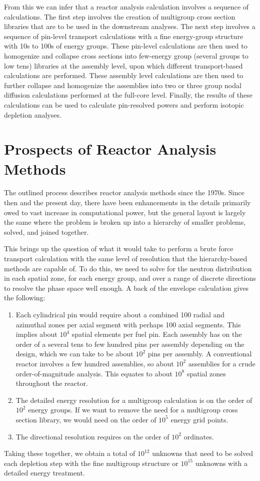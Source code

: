 From this we can infer that a reactor analysis calculation involves a sequence of calculations. The first step involves the creation of multigroup cross section libraries that are to be used in the downstream analyses. The next step involves a sequence of pin-level transport calculations with a fine energy-group structure with 10s to 100s of energy groups. These pin-level calculations are then used to homogenize and collapse cross sections into few-energy group (several groups to low tens) libraries at the assembly level, upon which different transport-based calculations are performed. These assembly level calculations are then used to further collapse and homogenize the assemblies into two or three group nodal diffusion calculations performed at the full-core level. Finally, the results of these calculations can be used to calculate pin-resolved powers and perform isotopic depletion analyses.

\section*{Prospects of Reactor Analysis Methods}

The outlined process describes reactor analysis methods since the 1970s. Since then and the present day, there have been enhancements in the details primarily owed to vast increase in computational power, but the general layout is largely the same where the problem is broken up into a hierarchy of smaller problems, solved, and joined together. 

This brings up the question of what it would take to perform a brute force transport calculation with the same level of resolution that the hierarchy-based methods are capable of. To do this, we need to solve for the neutron distribution in each spatial zone, for each energy group, and over a range of discrete directions to resolve the phase space well enough. A back of the envelope calculation gives the following:
\begin{enumerate}
  \item Each cylindrical pin would require about a combined 100 radial and azimuthal zones per axial segment with perhaps 100 axial segments. This implies about $10^4$ spatial elements per fuel pin. Each assembly has on the order of a several tens to few hundred pins per assembly depending on the design, which we can take to be about $10^2$ pins per assembly. A conventional reactor involves a few hundred assemblies, so about $10^2$ assemblies for a crude order-of-magnitude analysis. This equates to about $10^8$ spatial zones throughout the reactor.
  \item The detailed energy resolution for a multigroup calculation is on the order of $10^2$ energy groups. If we want to remove the need for a multigroup cross section library, we would need on the order of $10^5$ energy grid points.
  \item The directional resolution requires on the order of $10^2$ ordinates.
\end{enumerate}
Taking these together, we obtain a total of $10^{12}$ unknowns that need to be solved each depletion step with the fine multigroup structure or $10^{15}$ unknowns with a detailed energy treatment.

